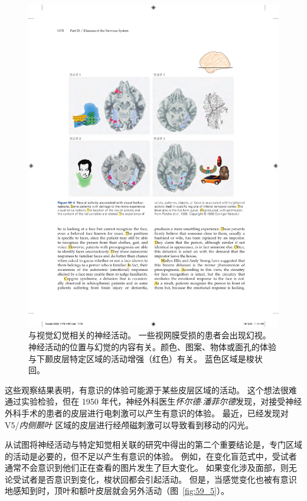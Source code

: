 \begin{figure}[htbp]
	\centering
	\includegraphics[width=1.0\linewidth]{chap59/fig_59_4}
	\caption{与视觉幻觉相关的神经活动。
		一些视网膜受损的患者会出现幻视。
		神经活动的位置与幻觉的内容有关。颜色、图案、物体或面孔的体验与下颞皮层特定区域的活动增强（红色）有关。
		蓝色区域是梭状回\cite{howard1998anatomy}。}
	\label{fig:59_4}
\end{figure}


这些观察结果表明，有意识的体验可能源于某些皮层区域的活动。
这个想法很难通过实验检验，但在 1950 年代，神经外科医生\textit{怀尔德$\cdot$潘菲尔德}发现，对接受神经外科手术的患者的皮层进行电刺激可以产生有意识的体验。
最近，已经发现对 V5/\textit{内侧颞叶} 区域的皮层进行经颅磁刺激可以导致看到移动的闪光。


从试图将神经活动与特定知觉相关联的研究中得出的第二个重要结论是，专门区域的活动是必要的，但不足以产生有意识的体验。
例如，在变化盲范式中，受试者通常不会意识到他们正在查看的图片发生了巨大变化。
如果变化涉及面部，则无论受试者是否意识到变化，梭状回都会引起活动。
但是，当感觉变化也被有意识地感知到时，顶叶和额叶皮层就会另外活动（图~\ref{fig:59_5}）。


